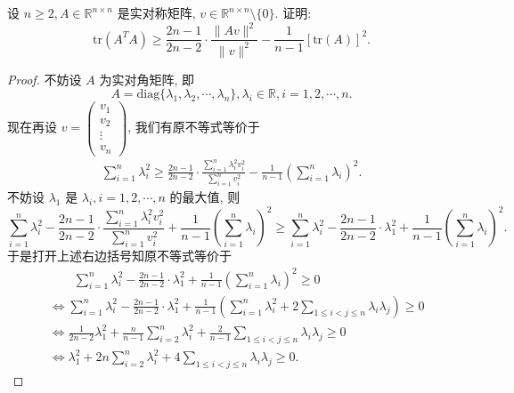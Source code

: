 \documentclass[../../main.tex]{subfiles}
\begin{document}
\begin{example}
设 \( n \geq 2, A \in \mathbb{R}^{n \times n} \) 是实对称矩阵, \( v \in \mathbb{R}^{n \times n} \setminus \{0\} \). 证明:
\[
\text{tr}(A^TA) \geq \frac{2n - 1}{2n - 2} \cdot \frac{\|Av\|^2}{\|v\|^2} - \frac{1}{n - 1}[\text{tr}(A)]^2.
\]
\end{example}
\begin{proof}
不妨设 \( A \) 为实对角矩阵, 即
\[
A = \text{diag}\{\lambda_1, \lambda_2, \cdots, \lambda_n\}, \lambda_i \in \mathbb{R}, i = 1,2,\cdots, n.
\]
现在再设 \( v = \begin{pmatrix} v_1 \\ v_2 \\ \vdots \\ v_n \end{pmatrix} \), 我们有原不等式等价于
\begin{align*}
\sum\limits_{i=1}^n \lambda_i^2 \geq \frac{2n - 1}{2n - 2} \cdot \frac{\sum\limits_{i=1}^n \lambda_i^2 v_i^2}{\sum\limits_{i=1}^n v_i^2} - \frac{1}{n - 1} \left( \sum\limits_{i=1}^n \lambda_i \right)^2. 
\end{align*}
不妨设 \( \lambda_1 \) 是 \( \lambda_i, i = 1,2,\cdots, n \) 的最大值, 则
\[
\sum\limits_{i=1}^n \lambda_i^2 - \frac{2n - 1}{2n - 2} \cdot \frac{\sum\limits_{i=1}^n \lambda_i^2 v_i^2}{\sum\limits_{i=1}^n v_i^2} + \frac{1}{n - 1} \left( \sum\limits_{i=1}^n \lambda_i \right)^2 \geqslant \sum\limits_{i=1}^n \lambda_i^2 - \frac{2n - 1}{2n - 2} \cdot \lambda_1^2 + \frac{1}{n - 1} \left( \sum\limits_{i=1}^n \lambda_i \right)^2.
\]
于是打开上述右边括号知原不等式等价于
\begin{align}
&\quad \quad \sum\limits_{i=1}^n{\lambda _{i}^{2}}-\frac{2n-1}{2n-2}\cdot \lambda _{1}^{2}+\frac{1}{n-1}\left( \sum\limits_{i=1}^n{\lambda _i} \right) ^2\geqslant 0
\nonumber \\
&\Longleftrightarrow \sum\limits_{i=1}^n{\lambda _{i}^{2}}-\frac{2n-1}{2n-2}\cdot \lambda _{1}^{2}+\frac{1}{n-1}\left( \sum\limits_{i=1}^n{\lambda _{i}^{2}}+2\sum\limits_{1\le i<j\le n}{\lambda _i\lambda _j} \right) \geqslant 0
\nonumber \\
&\Longleftrightarrow \frac{1}{2n-2}\lambda _{1}^{2}+\frac{n}{n-1}\sum\limits_{i=2}^n{\lambda _{i}^{2}}+\frac{2}{n-1}\sum\limits_{1\le i<j\le n}{\lambda _i\lambda _j}\geqslant 0
\nonumber \\
&\Longleftrightarrow \lambda _{1}^{2}+2n\sum\limits_{i=2}^n{\lambda _{i}^{2}}+4\sum\limits_{1\le i<j\le n}{\lambda _i\lambda _j}\geqslant 0.\label{eq:::-----1568165435
3615-11}
\end{align}

\end{proof}
\end{document}
